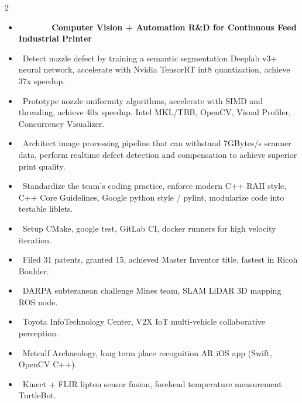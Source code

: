 \documentclass[10pt,letter,ragged2e,withhyper]{altacv}
\begin{document}
\begin{paracol}{2}
\divider


\begin{itemize}[leftmargin=1.8em, itemindent=-1.8em]
\item[] \textbf{~~~~~~~\textcolor{accent}{Computer Vision + Automation R\&D for Continuous Feed Industrial Printer}}
\item[] \faConnectdevelop ~Detect nozzle defect by training a semantic segmentation Deeplab v3+ neural network, accelerate with Nvidia TensorRT int8 quantization, achieve 37x speedup.
\item[] \faBarcode       ~Prototype nozzle uniformity algorithms, accelerate with SIMD and threading, achieve 40x speedup. Intel MKL/TBB, OpenCV, Visual Profiler, Concurrency Visualizer.
\item[] \faRocket ~Architect image processing pipeline that can withstand 7GBytes/s scanner data, \break perform realtime defect detection and compensation to achieve superior print quality.
\item[] \faCode ~Standardize the team's coding practice, enforce modern C++ RAII style, C++ Core Guidelines, Google python style / pylint, modularize code into testable liblets. 
\item[] \faGitlab ~Setup CMake, google test, GitLab CI, docker runners for high velocity iteration.
\item[] \faBalanceScale ~Filed 31 patents, granted 15, achieved Master Inventor title, fastest in Ricoh Boulder.
\end{itemize}

\divider

\begin{itemize}[leftmargin=1.8em, itemindent=-1.8em] 
\item[] \faMap ~DARPA subteranean challenge Mines team, SLAM LiDAR 3D mapping ROS node.
\item[] \faCar ~Toyota InfoTechnology Center, V2X IoT multi-vehicle collaborative perception.
\item[] \faApple ~Metcalf Archaeology, long term place recognition AR iOS app (Swift, OpenCV C++).
\item[] \faAndroid ~Kinect + FLIR lipton sensor fusion, forehead temperature measurement TurtleBot.
\end{itemize}
\newpage


\end{paracol}
\end{document}
